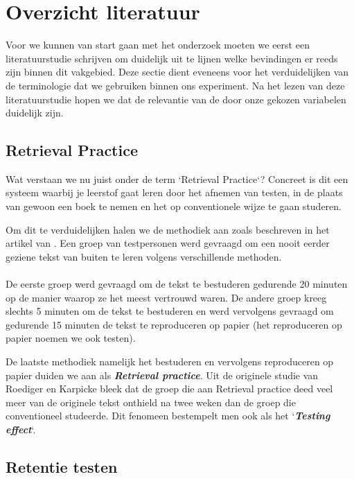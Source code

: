 \documentclass{hogent-article}
\newcommand{\boldit}[1]{\emph{\textbf{#1}}}
\begin{document}
\section{Overzicht literatuur}

Voor we kunnen van start gaan met het onderzoek moeten we eerst een literatuurstudie schrijven om duidelijk uit te lijnen welke bevindingen er reeds zijn binnen dit vakgebied. Deze sectie dient eveneens voor het verduidelijken van de terminologie dat we gebruiken binnen ons experiment. Na het lezen van deze literatuurstudie hopen we dat de relevantie van de door onze gekozen variabelen duidelijk zijn.

\subsection{Retrieval Practice}
\label{RetrievalPractice}
Wat verstaan we nu juist onder de term `Retrieval Practice`? Concreet is dit een systeem waarbij je leerstof gaat leren door het afnemen van testen, in de plaats van gewoon een boek te nemen en het op conventionele wijze te gaan studeren.\\
\par
\noindent
Om dit te verduidelijken halen we de methodiek aan zoals beschreven in het artikel van \textcite{Roediger_2006}. Een groep van testpersonen werd gevraagd om een nooit eerder geziene tekst van buiten te leren volgens verschillende methoden.\\\\De eerste groep werd gevraagd om de tekst te bestuderen gedurende 20 minuten op de manier waarop ze het meest vertrouwd waren. De andere groep kreeg slechts 5 minuten om de tekst te bestuderen en werd vervolgens gevraagd om gedurende 15 minuten de tekst te reproduceren op papier (het reproduceren op papier noemen we ook testen).\\

\par
\noindent
De laatste methodiek namelijk het bestuderen en vervolgens reproduceren op papier duiden we aan als \boldit{Retrieval practice}. Uit de originele studie van Roediger en Karpicke bleek dat de groep die aan Retrieval practice deed veel meer van de originele tekst onthield na twee weken dan de groep die conventioneel studeerde. Dit fenomeen bestempelt men ook als het `\boldit{Testing effect}`.

\subsection{Retentie testen}
\end{document}
